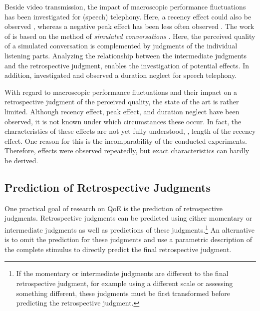 Beside video transmission, the impact of macroscopic performance fluctuations has been investigated for (speech) telephony. %
Here, a recency effect could also be observed \citep[\eg,][]{rosenbluth_testing_1998, hamberg_time-varying_1999, gros_instantaneous_2001, gros_effects_2004, belmudez_audiovisual_2015, weiss_modeling_2009, lewcio_management_2014}, whereas a negative peak effect has been less often observed \citep[\eg,][]{weiss_modeling_2009, belmudez_audiovisual_2015, lewcio_management_2014}.
The work of \citet{weiss_modeling_2009, lewcio_management_2014, belmudez_audiovisual_2015} is based on the method of \emph{simulated conversations} \citep{etsi_speech_2011}.
Here, the perceived quality of a simulated conversation is complemented by judgments of the individual listening parts.
Analyzing the relationship between the intermediate judgments and the retrospective judgment, enables the investigation of potential effects.
In addition, \citet{rosenbluth_testing_1998} investigated and observed a duration neglect for speech telephony.

With regard to macroscopic performance fluctuations and their impact on a retrospective judgment of the perceived quality, the state of the art is rather limited.
Although recency effect, peak effect, and duration neglect have been observed, it is not known under which circumstances these occur.
In fact, the characteristics of these effects are not yet fully understood, \eg, length of the recency effect.
One reason for this is the incomparability of the conducted experiments.
Therefore, effects were observed repeatedly, but exact characteristics can hardly be derived.

\subsection{Prediction of Retrospective Judgments}
One practical goal of research on \ac{QoE} is the prediction of retrospective judgments.
Retrospective judgments can be predicted using either momentary or intermediate judgments as well as predictions of these judgments.\footnote{If the momentary or intermediate judgments are different to the final retrospective judgment, for example using a different scale or assessing something different, these judgments must be first transformed before predicting the retrospective judgment.}
An alternative is to omit the prediction for these judgments and use a parametric description of the complete stimulus to directly predict the final retrospective judgment.

